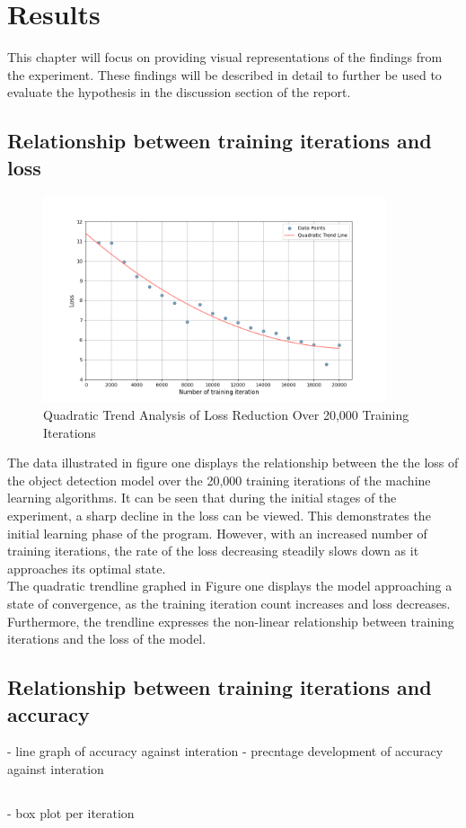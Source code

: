 

\section{Results}
This chapter will focus on providing visual representations of the findings from the experiment. These findings will be described in detail to further be used to evaluate the hypothesis in the discussion section of the report. 


\subsection{Relationship between training iterations and loss}
\begin{figure}[h]
   \centering
   \includegraphics[width=0.9\textwidth]{../Data/loss_by_iteration_plot.png}
   \caption{Quadratic Trend Analysis of Loss Reduction Over 20,000 Training Iterations}
   \label{fig:yourlabel}
\end{figure}
The data illustrated in figure one displays the relationship between the the loss of the object detection model over the 20,000 training iterations of the machine learning algorithms. It can be seen that during the initial stages of the experiment, a sharp decline in the loss can be viewed. This demonstrates the initial learning phase of the program. However, with an increased number of training iterations, the rate of the loss decreasing steadily slows down as it approaches its optimal state. \\

The quadratic trendline graphed in Figure one displays the model approaching a state of convergence, as the training iteration count increases and loss decreases. Furthermore, the trendline expresses the non-linear relationship between training iterations and the loss of the model. \\


\subsection{Relationship between training iterations and accuracy}
- line graph of accuracy against interation
- precntage development of accuracy    against interation


\subsection{}
- box plot per iteration 



